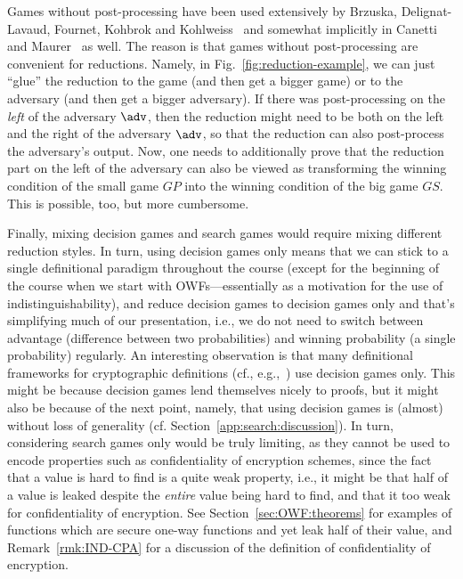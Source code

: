Games without post-processing have been used extensively by Brzuska, Delignat-Lavaud, Fournet, Kohbrok and Kohlweiss~\cite{BDFKK18} and somewhat implicitly in Canetti~\cite{Canetti20} and Maurer~\cite{Maurer10} as well. The reason is that games without post-processing are convenient for reductions. Namely, in Fig.~\ref{fig:reduction-example}, we can just ``glue'' the reduction to the game (and then get a bigger game) or to the adversary (and then get a bigger adversary). If there was post-processing on the \emph{left} of the adversary $\adv$, then the reduction might need to be both on the left and the right of the adversary $\adv$, so that the reduction can also post-process the adversary's output. Now, one needs to additionally prove that the reduction part on the left of the adversary can also be viewed as transforming the winning condition of the small game $GP$ into the winning condition of the big game $GS$. This is possible, too, but more cumbersome.

Finally, mixing decision games and search games would require mixing different reduction styles. In turn, using decision games only means that we can stick to a single definitional paradigm throughout the course (except for the beginning of the course when we start with OWFs---essentially as a motivation for the use of indistinguishability), and reduce decision games to decision games only and that's simplifying much of our presentation, i.e., we do not need to switch between advantage (difference between two probabilities) and winning probability (a single probability) regularly. An interesting observation is that many definitional frameworks for cryptographic definitions (cf., e.g.,~\cite{Canetti20,Maurer10,BDFKK18}) use decision games only. This might be because decision games lend themselves nicely to proofs, but it might also be because of the next point, namely, that using decision games is (almost) without loss of generality (cf. Section~\ref{app:search:discussion}).
In turn, considering search games only would be truly limiting, as they cannot be used to encode properties such as confidentiality of encryption schemes, since the fact that a value is hard to find is a quite weak property, i.e., it might be that half of a value is leaked despite the \emph{entire} value being hard to find, and that it too weak for confidentiality of encryption. See Section~\ref{sec:OWF:theorems} for examples of functions which are secure one-way functions and yet leak half of their value, and Remark~\ref{rmk:IND-CPA} for a discussion of the definition of confidentiality of encryption.

